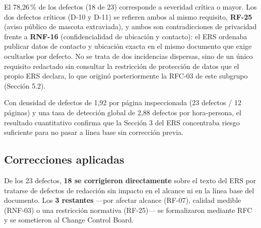 \documentclass[11pt]{article}
\begin{document}
	El 78,26\,\% de los defectos (18 de 23) corresponde a severidad crítica o mayor. Los dos defectos críticos (D-10 y D-11) se refieren ambos al mismo requisito, \textbf{RF-25} (aviso público de mascota extraviada), y ambos son contradicciones de privacidad frente a \textbf{RNF-16} (confidencialidad de ubicación y contacto): el ERS ordenaba publicar datos de contacto y ubicación exacta en el mismo documento que exige ocultarlos por defecto. No se trata de dos incidencias dispersas, sino de un único requisito redactado sin consultar la restricción de protección de datos que el propio ERS declara, lo que originó posteriormente la RFC-03 de este subgrupo (Sección 5.2).
	
	Con densidad de defectos de 1,92 por página inspeccionada (23 defectos / 12 páginas) y una tasa de detección global de 2,88 defectos por hora-persona, el resultado cuantitativo confirma que la Sección 3 del ERS concentraba riesgo suficiente para no pasar a línea base sin corrección previa.
	
	\subsection{Correcciones aplicadas}
	
	De los 23 defectos, \textbf{18 se corrigieron directamente} sobre el texto del ERS por tratarse de defectos de redacción sin impacto en el alcance ni en la línea base del documento. Los \textbf{3 restantes} ---por afectar alcance (RF-07), calidad medible (RNF-03) o una restricción normativa (RF-25)--- se formalizaron mediante RFC y se sometieron al Change Control Board.
	
\end{document}
